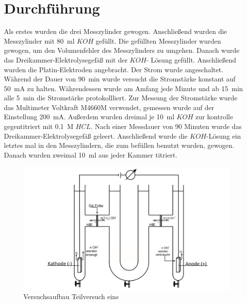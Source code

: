 \section{Durchführung}
Als erstes wurden die drei Messzylinder gewogen. Anschließend wurden die Messzylinder mit 80\ ml $KOH$ gefüllt. Die gefüllten Messzylinder wurden gewogen, um den Volumenfehler des Messzylinders zu umgehen. Danach wurde das Dreikammer-Elektrolysegefäß mit der $KOH$- Lösung gefüllt. Anschließend wurden die Platin-Elektroden angebracht. Der Strom wurde angeschaltet. Während der Dauer von 90\ min wurde versucht die Stromstärke konstant auf 50\ mA zu halten. Währendessen wurde am Amfang jede Minute und ab 15\ min alle 5\ min die Stromstärke protokollliert. Zur Messung der Stromstärke wurde das Multimeter  Voltkraft M4660M verwendet, gemessen wurde auf der Einstellung 200\ mA. Außerdem wurden dreimal je 10\ ml $KOH$ zur kontrolle gegentitriert mit 0.1\ M $HCL$. Nach einer Messdauer von 90 Minuten wurde das Dreikammer-Elektrolysegefäß geleert. Anschließend wurde die $KOH$-Lösung ein letztes mal in den Messzylindern, die zum befüllen benutzt wurden, gewogen. Danach wurden zweimal 10\ ml  aus jeder Kammer titriert.
\begin{figure}[H]
\centering
\includegraphics[scale=0.4]{Dreikammer.jpg}
\caption{Versuchsaufbau Teilversuch eins}
\end{figure}

